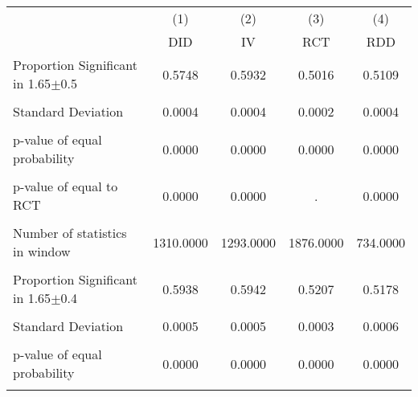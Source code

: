 {
\def\sym#1{\ifmmode^{#1}\else\(^{#1}\)\fi}
\begin{tabular}{l*{4}{c}}
\hline\hline
                &\multicolumn{1}{c}{(1)}&\multicolumn{1}{c}{(2)}&\multicolumn{1}{c}{(3)}&\multicolumn{1}{c}{(4)}\\
                &\multicolumn{1}{c}{DID}&\multicolumn{1}{c}{IV}&\multicolumn{1}{c}{RCT}&\multicolumn{1}{c}{RDD}\\
\hline
\hline Proportion Significant in 1.65$\pm$0.5&   0.5748         &   0.5932         &   0.5016         &   0.5109         \\
                &                  &                  &                  &                  \\
Standard Deviation&   0.0004         &   0.0004         &   0.0002         &   0.0004         \\
                &                  &                  &                  &                  \\
p-value of equal probability&   0.0000         &   0.0000         &   0.0000         &   0.0000         \\
                &                  &                  &                  &                  \\
p-value of equal to RCT&   0.0000         &   0.0000         &        .         &   0.0000         \\
                &                  &                  &                  &                  \\
Number of statistics in window&1310.0000         &1293.0000         &1876.0000         & 734.0000         \\
                &                  &                  &                  &                  \\
\hline Proportion Significant in 1.65$\pm$0.4&   0.5938         &   0.5942         &   0.5207         &   0.5178         \\
                &                  &                  &                  &                  \\
Standard Deviation&   0.0005         &   0.0005         &   0.0003         &   0.0006         \\
                &                  &                  &                  &                  \\
p-value of equal probability&   0.0000         &   0.0000         &   0.0000         &   0.0000         \\
                &                  &                  &                  &                  \\

\end{tabular}}

